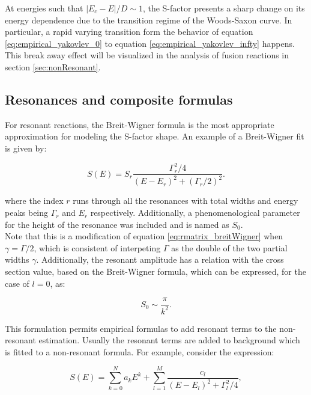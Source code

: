 \documentclass[openany]{book}
\begin{document}
At energies such that $|E_c - E|/D \sim 1$, the S-factor presents a sharp change on its energy dependence due to the transition regime of the Woods-Saxon curve. In particular, a rapid varying transition form the behavior of equation \ref{eq:empirical_yakovlev_0} to equation  \ref{eq:empirical_yakovlev_infty} happens. This break away effect will be visualized in the analysis of fusion reactions in section \ref{sec:nonResonant}. 
 
\subsection{Resonances and composite formulas} \label{sub:empirical_resonances}


For resonant reactions, the Breit-Wigner formula is the most appropriate approximation for modeling the S-factor shape. An example of a Breit-Wigner fit is given by: 

\begin{equation} \label{eq:empirical_breitWigner}
	S(E) = S_r \frac{\Gamma^2_r/4}{(E-E_r)^2 + (\Gamma_r/2)^2}.
\end{equation}

where the index $r$ runs through all the resonances with total widths and energy peaks being $\Gamma_r$ and $E_r$ respectively. Additionally, a phenomenological parameter for the height of the resonance was included and is named as $S_0$. \\

 Note that this is a modification of equation \ref{eq:rmatrix_breitWigner} when $\gamma = \Gamma/2$, which is consistent of interpeting $\Gamma$ as the double of the two partial widths $\gamma$. Additionally, the resonant amplitude has a relation with the cross section value, based on the Breit-Wigner formula, which can be expressed, for the case of $l = 0$, as: 
 
 \begin{equation} \label{eq:empirical_breitWigner_S0}
 	S_0 \sim  \frac{\pi}{k^2}. 
 \end{equation}

This formulation permits empirical formulas to add resonant terms to the non-resonant estimation. Usually the resonant terms are added to background which is fitted to a non-resonant formula. For example, consider the expression: 

\begin{equation}  \label{eq:empirical_hybridPolynomial}
	S(E) =  \sum _{k = 0}^{N} {a_kE^k} + \sum_{l = 1}^{M} {\frac{c_l}{(E - E_l)^2 + \Gamma_l^2/4}},
\end{equation}
\end{document}
